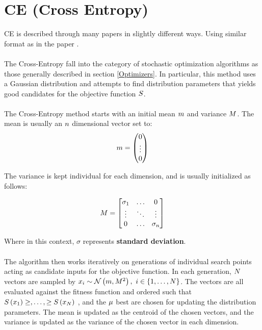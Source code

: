 \section{CE (Cross Entropy) \label{CrossEntropy}}
CE is described through many papers in 
slightly different ways. Using similar 
format as in the paper \citep{thiery:09}.\\
\\
The Cross-Entropy fall into the category of stochastic 
optimization algorithms
as those generally described in 
section \ref{Optimizers}. In particular, this 
method uses a Gaussian distribution and 
attempts to find distribution parameters 
that yields good candidates for the 
objective function $S$.\\
\\
The Cross-Entropy method starts with an initial 
mean $m$ and variance $M$. 
The mean is usually an $n$ dimensional vector
set to:
\begin{align*}
m = \begin{pmatrix}
0\\
\vdots\\
0
\end{pmatrix} 
\end{align*}

The variance is kept individual for each dimension, 
and is usually initialized as follows:

\begin{align*}
M =
\begin{bmatrix}
\sigma_1 & \hdots & 0\\
\vdots & \ddots & \vdots\\
0 & \hdots & \sigma_{n}
\end{bmatrix}
\end{align*}

Where in this context, $\sigma$ represents \textbf{standard deviation}.\\
\\
The algorithm then works iteratively on generations of individual
search points acting as candidate inputs for the objective function.
In each generation, $N$ vectors are sampled by 
$x_{i} \sim \mathcal{N} \left(m, M^{2} \right)
,\ i \in \{1,\dots,N \}$. The vectors are all evaluated 
against the fitness function and ordered such that $S \left( x_{1} \right) \geq, \dots, \geq S \left( x_{N} \right)$
, and the $\mu$ best are chosen for updating the distribution 
parameters. The mean is updated as the centroid of the chosen vectors, and
the variance is updated as the variance of the chosen vector in each 
dimension.\\

